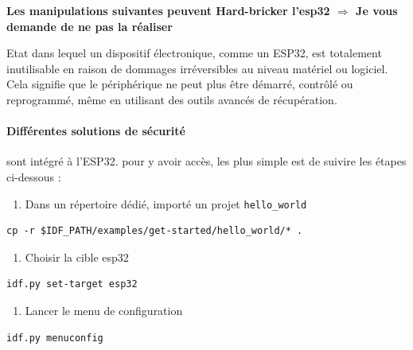 \documentclass[french, 12pt]{article}%
\newcommand{\titreencadre}{Titre}
\newenvironment{encadre}[1]{\renewcommand{\titreencadre}{#1}
	\begin{mdframed}[style=encadrestyle]
	\vspace{0.5\baselineskip}
	}{%
	\end{mdframed}}
\begin{document}
\huge
\begin{center}
\vspace{0.5cm}
\textbf{Les manipulations suivantes peuvent Hard-bricker l'esp32 
$\Rightarrow$ Je vous demande de ne pas la réaliser}
\end{center}
\vspace{0.5cm}
\normalsize

\begin{encadre}{Hard-bricked}
Etat dans lequel un dispositif électronique, comme un ESP32, est totalement inutilisable en raison de dommages irréversibles au niveau matériel ou logiciel. Cela signifie que le périphérique ne peut plus être démarré, contrôlé ou reprogrammé, même en utilisant des outils avancés de récupération.
\end{encadre}


\paragraph{Différentes solutions de sécurité} sont intégré à l'ESP32. pour y avoir accès, les plus simple est de suivire les étapes ci-dessous :

\begin{enumerate}
\item Dans un répertoire dédié, importé un projet \verb?hello_world?
\end{enumerate}

\begin{lstlisting}[style=commande]
cp -r $IDF_PATH/examples/get-started/hello_world/* .
\end{lstlisting}



\begin{enumerate}[resume]
\item Choisir la cible esp32
\end{enumerate}

\begin{lstlisting}[style=commande]
idf.py set-target esp32
\end{lstlisting}


\begin{enumerate}[resume]
\item Lancer le menu de configuration
\end{enumerate}

\begin{lstlisting}[style=commande]
idf.py menuconfig
\end{lstlisting}
\end{document}

